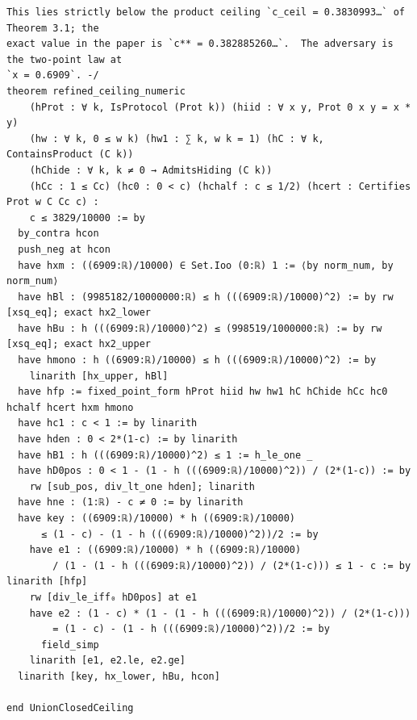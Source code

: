 \documentclass[11pt,a4paper]{article}
\theoremstyle{definition}
\theoremstyle{remark}
\begin{document}
\begin{Verbatim}[fontsize=\scriptsize,formatcom=\leanmono,samepage=false]
This lies strictly below the product ceiling `c_ceil = 0.3830993…` of Theorem 3.1; the
exact value in the paper is `c** = 0.382885260…`.  The adversary is the two-point law at
`x = 0.6909`. -/
theorem refined_ceiling_numeric
    (hProt : ∀ k, IsProtocol (Prot k)) (hiid : ∀ x y, Prot 0 x y = x * y)
    (hw : ∀ k, 0 ≤ w k) (hw1 : ∑ k, w k = 1) (hC : ∀ k, ContainsProduct (C k))
    (hChide : ∀ k, k ≠ 0 → AdmitsHiding (C k))
    (hCc : 1 ≤ Cc) (hc0 : 0 < c) (hchalf : c ≤ 1/2) (hcert : Certifies Prot w C Cc c) :
    c ≤ 3829/10000 := by
  by_contra hcon
  push_neg at hcon
  have hxm : ((6909:ℝ)/10000) ∈ Set.Ioo (0:ℝ) 1 := ⟨by norm_num, by norm_num⟩
  have hBl : (9985182/10000000:ℝ) ≤ h (((6909:ℝ)/10000)^2) := by rw [xsq_eq]; exact hx2_lower
  have hBu : h (((6909:ℝ)/10000)^2) ≤ (998519/1000000:ℝ) := by rw [xsq_eq]; exact hx2_upper
  have hmono : h ((6909:ℝ)/10000) ≤ h (((6909:ℝ)/10000)^2) := by
    linarith [hx_upper, hBl]
  have hfp := fixed_point_form hProt hiid hw hw1 hC hChide hCc hc0 hchalf hcert hxm hmono
  have hc1 : c < 1 := by linarith
  have hden : 0 < 2*(1-c) := by linarith
  have hB1 : h (((6909:ℝ)/10000)^2) ≤ 1 := h_le_one _
  have hD0pos : 0 < 1 - (1 - h (((6909:ℝ)/10000)^2)) / (2*(1-c)) := by
    rw [sub_pos, div_lt_one hden]; linarith
  have hne : (1:ℝ) - c ≠ 0 := by linarith
  have key : ((6909:ℝ)/10000) * h ((6909:ℝ)/10000)
      ≤ (1 - c) - (1 - h (((6909:ℝ)/10000)^2))/2 := by
    have e1 : ((6909:ℝ)/10000) * h ((6909:ℝ)/10000)
        / (1 - (1 - h (((6909:ℝ)/10000)^2)) / (2*(1-c))) ≤ 1 - c := by linarith [hfp]
    rw [div_le_iff₀ hD0pos] at e1
    have e2 : (1 - c) * (1 - (1 - h (((6909:ℝ)/10000)^2)) / (2*(1-c)))
        = (1 - c) - (1 - h (((6909:ℝ)/10000)^2))/2 := by
      field_simp
    linarith [e1, e2.le, e2.ge]
  linarith [key, hx_lower, hBu, hcon]

end UnionClosedCeiling
\end{Verbatim}
\end{document}
